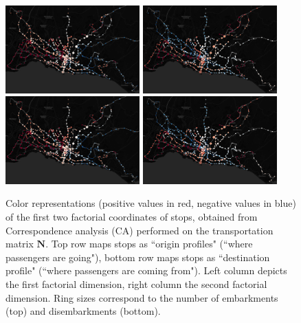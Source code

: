 \documentclass{bmcart}
\begin{document}
\begin{figure}[h]
	\includegraphics[width=0.46\textwidth]{fig/afc_in_dim1.png}
	\includegraphics[width=0.46\textwidth]{fig/afc_in_dim2.png} \\
	\includegraphics[width=0.46\textwidth]{fig/afc_out_dim1.png}
	\includegraphics[width=0.46\textwidth]{fig/afc_out_dim2.png}
	\caption{Color representations (positive values in red, negative values in blue) of the first two factorial coordinates of stops, obtained from Correspondence analysis (CA) performed on the transportation matrix $\mathbf{N}$. Top row maps stops as ``origin profiles" (``where passengers are going"), bottom row maps stops as ``destination profile" (``where passengers are coming from"). Left column depicts the first factorial dimension, right column the second factorial dimension. Ring sizes correspond to the number of embarkments (top) and disembarkments (bottom).}
	\label{afc}
\end{figure}
\end{document}
